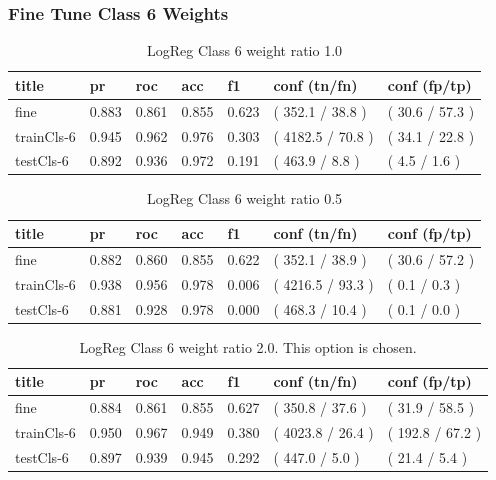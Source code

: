 \documentclass[ms]{nuthesis}
\begin{document}
\subsubsection{Fine Tune Class 6 Weights}

\FloatBarrier
\begin{table}[H]
\centering
\begin{tabular}{|l||l||l||l||l||l||l|}\toprule
title & pr & roc & acc & f1 & conf (tn/fn) & conf (fp/tp) \\ \midrule
fine & 0.883 & 0.861 & 0.855 & 0.623 & ( 352.1 / 38.8 ) & ( 30.6 / 57.3 ) \\
trainCls-6 & 0.945 & 0.962 & 0.976 & 0.303 & ( 4182.5 / 70.8 ) & ( 34.1 / 22.8 ) \\
testCls-6 & 0.892 & 0.936 & 0.972 & 0.191 & ( 463.9 / 8.8 ) & ( 4.5 / 1.6 ) \\ \bottomrule
\end{tabular}
\caption{LogReg Class 6 weight ratio 1.0}
\label{tab:LogRegCls6-Wt1}
\end{table}
\FloatBarrier

\FloatBarrier
\begin{table}[H]
\centering
\begin{tabular}{|l||l||l||l||l||l||l|}\toprule
title & pr & roc & acc & f1 & conf (tn/fn) & conf (fp/tp) \\ \midrule
fine & 0.882 & 0.860 & 0.855 & 0.622 & ( 352.1 / 38.9 ) & ( 30.6 / 57.2 ) \\
trainCls-6 & 0.938 & 0.956 & 0.978 & 0.006 & ( 4216.5 / 93.3 ) & ( 0.1 / 0.3 ) \\
testCls-6 & 0.881 & 0.928 & 0.978 & 0.000 & ( 468.3 / 10.4 ) & ( 0.1 / 0.0 ) \\ \bottomrule
\end{tabular}
\caption{LogReg Class 6 weight ratio 0.5}
\label{tab:LogRegCls6-Wtp5}
\end{table}
\FloatBarrier


\FloatBarrier
\begin{table}[H]
\centering
\begin{tabular}{|l||l||l||l||l||l||l|}\toprule
title & pr & roc & acc & f1 & conf (tn/fn) & conf (fp/tp) \\ \midrule
fine & 0.884 & 0.861 & 0.855 & 0.627 & ( 350.8 / 37.6 ) & ( 31.9 / 58.5 ) \\
trainCls-6 & 0.950 & 0.967 & 0.949 & 0.380 & ( 4023.8 / 26.4 ) & ( 192.8 / 67.2 ) \\
testCls-6 & 0.897 & 0.939 & 0.945 & 0.292 & ( 447.0 / 5.0 ) & ( 21.4 / 5.4 ) \\ \bottomrule
\end{tabular}
\caption{LogReg Class 6 weight ratio 2.0. This option is chosen.}
\label{tab:LogRegCls6-Wt2}
\end{table}
\FloatBarrier
\end{document}
